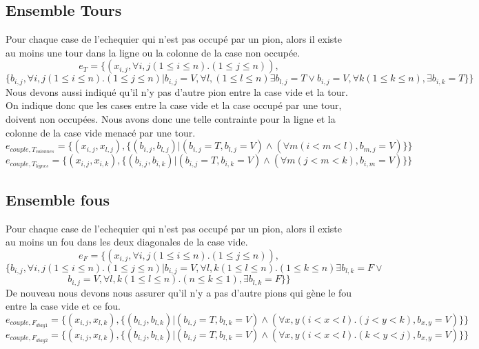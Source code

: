 \documentclass[a4paper,10pt]{article}
\begin{document}
	\subsection{Ensemble Tours}
		Pour chaque case de l'echequier qui n'est pas occupé par un pion, alors il existe au moins une tour dans la ligne ou la colonne de la case non occupée.
		$$ e_T = \{(x_{i,j}, \forall i,j (1 \leq i \leq n).(1 \leq j \leq n)),$$ $$\{b_{i,j}, \forall i,j (1 \leq i \leq n).(1 \leq j \leq n)|b_{i,j} = V, \forall l, (1 \leq l \leq n) \exists b_{l,j} = T \lor b_{i,j} = V, \forall k (1 \leq k \leq n), \exists b_{i,k} = T\}\}  $$
			Nous devons aussi indiqué qu'il n'y pas d'autre pion entre la case vide et la tour.  On indique donc que les cases entre la case vide et la case occupé par une tour, doivent non occupées. Nous avons donc une telle contrainte pour la ligne et la colonne de la case vide menacé par une tour.
		$$ e_{couple,T_{colonnes}} = \{(x_{i,j}, x_{l,j}), \{(b_{i,j}, b_{l,j})|(b_{i,j} = T, b_{l,j} = V) \land ( \forall m (i < m < l), b_{m,j} = V) \}\}$$
		$$ e_{couple,T_{lignes}} = \{(x_{i,j}, x_{i,k}), \{(b_{i,j}, b_{i,k})|(b_{i,j} = T, b_{i,k} = V) \land ( \forall m (j < m < k), b_{i,m} = V) \}\}$$

	\subsection{Ensemble fous}
		Pour chaque case de l'echequier qui n'est pas occupé par un pion, alors il existe au moins un fou dans les deux diagonales de la case vide.
		$$ e_F = \{(x_{i,j}, \forall i,j (1 \leq i \leq n).(1 \leq j \leq n)),$$ $$\{b_{i,j},\forall i,j (1 \leq i \leq n).(1 \leq j \leq n)|b_{i,j} = V, \forall l,k (1 \leq l \leq n).(1 \leq k \leq n) \exists b_{l,k} = F \lor$$ $$b_{i,j} = V, \forall l,k (1 \leq l \leq n).(n \leq k \leq 1), \exists b_{l,k} = F\}\}  $$
			De nouveau nous devons nous assurer qu'il n'y a pas d'autre pions qui gène le fou entre la case vide et ce fou.
		$$ e_{couple,F_{diag1}} = \{(x_{i,j}, x_{l,k}), \{(b_{i,j}, b_{l,k})|(b_{i,j} = T, b_{l,k} = V) \land ( \forall x,y (i < x < l).(j < y < k), b_{x,y} = V) \}\}$$
		$$ e_{couple,F_{diag2}} = \{(x_{i,j}, x_{l,k}), \{(b_{i,j}, b_{l,k})|(b_{i,j} = T, b_{l,k} = V) \land ( \forall x,y (i < x < l).(k < y < j), b_{x,y} = V) \}\}$$
\end{document}
